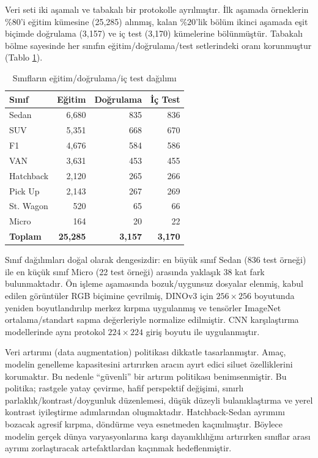 \documentclass[conference]{IEEEtran}
\begin{document}
Veri seti iki aşamalı ve tabakalı bir protokolle ayrılmıştır. İlk aşamada örneklerin $\%80$'i eğitim kümesine (25,285) alınmış, kalan $\%20$'lik bölüm ikinci aşamada eşit biçimde doğrulama (3,157) ve iç test (3,170) kümelerine bölünmüştür. Tabakalı bölme sayesinde her sınıfın eğitim/doğrulama/test setlerindeki oranı korunmuştur (Tablo \ref{tab:split_dist}).

\begin{table}[h]
\centering
\small
\caption{Sınıfların eğitim/doğrulama/iç test dağılımı}
\label{tab:split_dist}
\begin{tabular}{@{}lrrr@{}}
\toprule
\textbf{Sınıf} & \textbf{Eğitim} & \textbf{Doğrulama} & \textbf{İç Test} \\ \midrule
Sedan       & 6,680 & 835 & 836 \\
SUV         & 5,351 & 668 & 670 \\
F1          & 4,676 & 584 & 586 \\
VAN         & 3,631 & 453 & 455 \\
Hatchback   & 2,120 & 265 & 266 \\
Pick Up     & 2,143 & 267 & 269 \\
St. Wagon   & 520   & 65  & 66  \\
Micro       & 164   & 20  & 22  \\ \midrule
\textbf{Toplam} & \textbf{25,285} & \textbf{3,157} & \textbf{3,170} \\ \bottomrule
\end{tabular}
\end{table}

Sınıf dağılımları doğal olarak dengesizdir: en büyük sınıf Sedan (836 test örneği) ile en küçük sınıf Micro (22 test örneği) arasında yaklaşık 38 kat fark bulunmaktadır. Ön işleme aşamasında bozuk/uygunsuz dosyalar elenmiş, kabul edilen görüntüler RGB biçimine çevrilmiş, DINOv3 için $256\times256$ boyutunda yeniden boyutlandırılıp merkez kırpma uygulanmış ve tensörler ImageNet ortalama/standart sapma değerleriyle normalize edilmiştir. CNN karşılaştırma modellerinde aynı protokol $224\times224$ giriş boyutu ile uygulanmıştır.

Veri artırımı (data augmentation) politikası dikkatle tasarlanmıştır. Amaç, modelin genelleme kapasitesini artırırken aracın ayırt edici siluet özelliklerini korumaktır. Bu nedenle ``güvenli'' bir artırım politikası benimsenmiştir. Bu politika; rastgele yatay çevirme, hafif perspektif değişimi, sınırlı parlaklık/kontrast/doygunluk düzenlemesi, düşük düzeyli bulanıklaştırma ve yerel kontrast iyileştirme adımlarından oluşmaktadır. Hatchback-Sedan ayrımını bozacak agresif kırpma, döndürme veya esnetmeden kaçınılmıştır. Böylece modelin gerçek dünya varyasyonlarına karşı dayanıklılığını artırırken sınıflar arası ayrımı zorlaştıracak artefaktlardan kaçınmak hedeflenmiştir.
\end{document}
